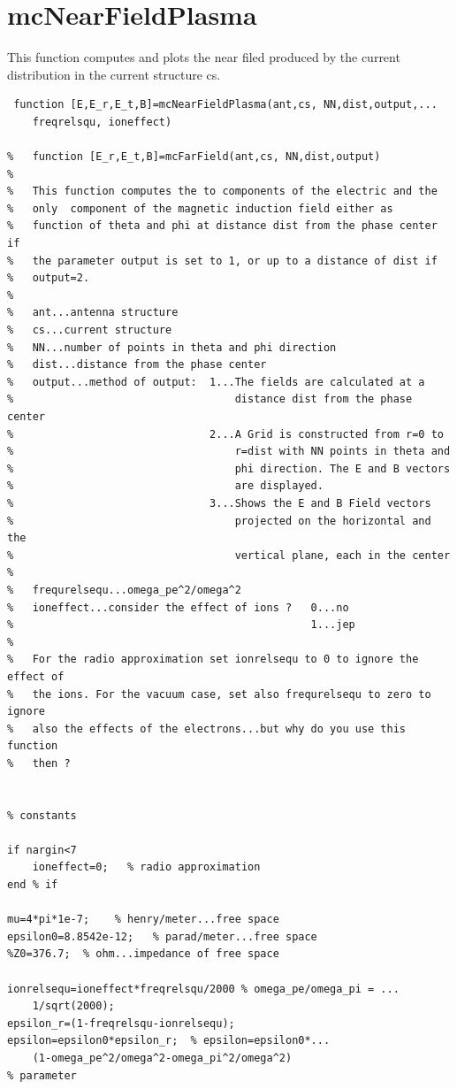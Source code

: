 \documentclass[a4paper,11pt]{thesis}
\begin{document}
\section{mcNearFieldPlasma}
This function computes and plots the near filed produced by the current distribution in the current structure cs.
\small
\begin{verbatim}
 function [E,E_r,E_t,B]=mcNearFieldPlasma(ant,cs, NN,dist,output,...
 	freqrelsqu, ioneffect)

%   function [E_r,E_t,B]=mcFarField(ant,cs, NN,dist,output)
%
%   This function computes the to components of the electric and the
%   only  component of the magnetic induction field either as
%   function of theta and phi at distance dist from the phase center if
%   the parameter output is set to 1, or up to a distance of dist if
%   output=2.
%
%   ant...antenna structure
%   cs...current structure
%   NN...number of points in theta and phi direction
%   dist...distance from the phase center
%   output...method of output:  1...The fields are calculated at a
%                                   distance dist from the phase center
%                               2...A Grid is constructed from r=0 to
%                                   r=dist with NN points in theta and
%                                   phi direction. The E and B vectors
%                                   are displayed.
%                               3...Shows the E and B Field vectors
%                                   projected on the horizontal and the
%                                   vertical plane, each in the center
%
%   frequrelsequ...omega_pe^2/omega^2
%   ioneffect...consider the effect of ions ?   0...no
%                                               1...jep
%
%   For the radio approximation set ionrelsequ to 0 to ignore the effect of
%   the ions. For the vacuum case, set also frequrelsequ to zero to ignore
%   also the effects of the electrons...but why do you use this function
%   then ?


% constants

if nargin<7
    ioneffect=0;   % radio approximation
end % if

mu=4*pi*1e-7;    % henry/meter...free space
epsilon0=8.8542e-12;   % parad/meter...free space
%Z0=376.7;  % ohm...impedance of free space

ionrelsequ=ioneffect*freqrelsqu/2000 % omega_pe/omega_pi = ...
	1/sqrt(2000);
epsilon_r=(1-freqrelsqu-ionrelsequ);
epsilon=epsilon0*epsilon_r;  % epsilon=epsilon0*...
	(1-omega_pe^2/omega^2-omega_pi^2/omega^2)
% parameter


\end{verbatim}
\end{document}
